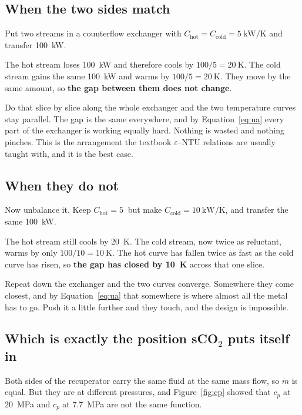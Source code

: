 \documentclass[11pt,a4paper]{report}
\begin{document}
\subsection{When the two sides match}

Put two streams in a counterflow exchanger with $C_{\text{hot}} =
C_{\text{cold}} = \SI{5}{\kilo\watt\per\kelvin}$ and transfer
\SI{100}{\kilo\watt}.

The hot stream loses \SI{100}{\kilo\watt} and therefore cools by
$100/5 = \SI{20}{\kelvin}$. The cold stream gains the same
\SI{100}{\kilo\watt} and warms by $100/5 = \SI{20}{\kelvin}$. They move by
the same amount, so \textbf{the gap between them does not change}.

Do that slice by slice along the whole exchanger and the two temperature
curves stay parallel. The gap is the same everywhere, and by
Equation~\eqref{eq:ua} every part of the exchanger is working equally hard.
Nothing is wasted and nothing pinches. This is the arrangement the textbook
$\varepsilon$--NTU relations are usually taught with, and it is the best
case.

\subsection{When they do not}

Now unbalance it. Keep $C_{\text{hot}} = \SI{5}{}$ but make
$C_{\text{cold}} = \SI{10}{\kilo\watt\per\kelvin}$, and transfer the same
\SI{100}{\kilo\watt}.

The hot stream still cools by \SI{20}{\kelvin}. The cold stream, now twice
as reluctant, warms by only $100/10 = \SI{10}{\kelvin}$. The hot curve has
fallen twice as fast as the cold curve has risen, so \textbf{the gap has
closed by \SI{10}{\kelvin}} across that one slice.

Repeat down the exchanger and the two curves converge. Somewhere they come
closest, and by Equation~\eqref{eq:ua} that somewhere is where almost all
the metal has to go. Push it a little further and they touch, and the design
is impossible.

\subsection{Which is exactly the position sCO$_2$ puts itself in}

Both sides of the recuperator carry the same fluid at the same mass flow,
so $\dot m$ is equal. But they are at different pressures, and
Figure~\ref{fig:cp} showed that $c_p$ at \SI{20}{\mega\pascal} and $c_p$ at
\SI{7.7}{\mega\pascal} are not the same function.
\end{document}
